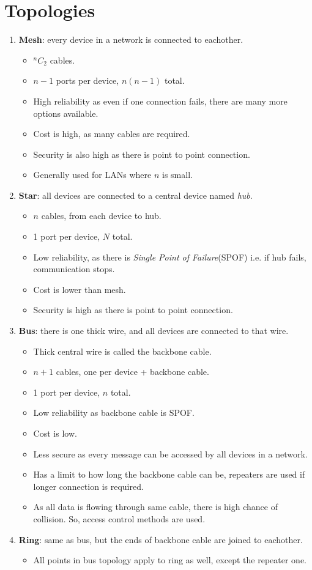 \documentclass{article}
\begin{document}
\section{Topologies}
\renewcommand{\labelitemi}{-}
\renewcommand{\labelitemii}{*}
\begin{enumerate}
	\item \textbf{Mesh}: every device in a network is connected to eachother.\begin{itemize}
		\item $^nC_2$ cables.
		\item $n-1$ ports per device, $n(n-1)$ total.
		\item High reliability as even if one connection fails, there are many more options available.
		\item Cost is high, as many cables are required.
		\item Security is also high as there is point to point connection.
		\item Generally used for LANs where $n$ is small.
	\end{itemize}
	\item \textbf{Star}: all devices are connected to a central device named \emph{hub}.\begin{itemize}
		\item $n$ cables, from each device to hub.
		\item 1 port per device, $N$ total.
		\item Low reliability, as there is \emph{Single Point of Failure}(SPOF) i.e. if hub fails, communication stops.
		\item Cost is lower than mesh.
		\item Security is high as there is point to point connection.
	\end{itemize}
	\item \textbf{Bus}: there is one thick wire, and all devices are connected to that wire.\begin{itemize}
		\item Thick central wire is called the backbone cable.
		\item $n+1$ cables, one per device + backbone cable.
		\item 1 port per device, $n$ total.
		\item Low reliability as backbone cable is SPOF.
		\item Cost is low.
		\item Less secure as every message can be accessed by all devices in a network.
		\item Has a limit to how long the backbone cable can be, repeaters are used if longer connection is required.
		\item As all data is flowing through same cable, there is high chance of collision. So, access control methods are used.
	\end{itemize}
	\item \textbf{Ring}: same as bus, but the ends of backbone cable are joined to eachother.\begin{itemize}
		\item All points in bus topology apply to ring as well, except the repeater one.
	\end{itemize}
\end{enumerate}
\end{document}
